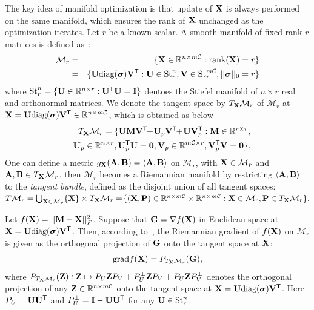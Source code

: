 \documentclass[letterpaper]{article}
\def\M{\mathcal{M}}
\def\R{{\mathbb R}}
\def\U{{\bf U}}
\def\V{{\bf V}}
\def\diag{\mbox{diag}}
\def\bsigma{\mbox{{\boldmath $\sigma$}}}
\def\trsp{{\sf T}}
\def\I{{\bf I}}
\def\0{{\bf 0}}
\def\G{{\bf G}}
\def\grad{{\text{grad}}}
\def\bZ{{\bf Z}}
\def\bA{{\bf A}}
\def\bB{{\bf B}}
\def\bM{{\bf M}}
\def\calC{{\mathcal{C}}}
\def\bX{{\bf X}}
\def\bA{{\bf A}}
\def\bX{{\bf X}}
\def\bP{{\bf P}}
\def\rank{{\text{rank}}}
\begin{document}
The key idea of manifold optimization is that update of $\bX$ is always performed on the same manifold, which ensures the rank of $\bX$ unchanged as the optimization iterates.
Let $r$ be a known scalar.
A smooth manifold of fixed-rank-$r$ matrices is defined as~\cite{vandereycken2013lowrank}:
\begin{eqnarray}
\M_{r} &=& \{\bX\in \R^{n\times m\calC}: \rank(\bX) = r\} \nonumber \\
       &=& \{\U\diag(\bsigma)\V^{\trsp}: \U \in \textrm{St}_{r}^{n}, \V \in
           \textrm{St}_{r}^{m\calC}, ||\bsigma||_0 = r\} \nonumber
\end{eqnarray}
\noindent
where $\textrm{St}_{r}^{n} = \{\U \in \R^{n\times r}:
\U^{\trsp}\U = \I \}$ dentoes the Stiefel manifold of $n\times r$ real and orthonormal matrices.
We denote the tangent space by $T_{\bX}\M_{r}$ of $\M_{r}$ at $\bX = \U\diag(\bsigma)\V^{\trsp} \in \R^{n \times m\calC}$,
which is obtained as below
\begin{eqnarray}\label{eq:tangent_vector}
&&T_{\bX}\M_{r} =  \{\U\bM\V^{\trsp} \!\!+\! \U_p\V^{\trsp} \!\!+\!
\U\V_p^{\trsp}: \bM \in \R^{r\times r}, \nonumber\\ && \U_p \in \R^{n\times r},
\U_p^{\trsp}\U = \0, \V_p \in \R^{m\calC \times r}, \V_p^{\trsp}\V = \0\}.
\end{eqnarray}
\noindent
One can define a metric $g_{\bX}({\bA},{\bB}) = \langle{\bA},{\bB}\rangle$ on $\M_{r}$,
with $\bX \in \M_{r}$ and ${\bA},{\bB} \in T_{\bX}\M_{r}$,
then $\M_{r}$ becomes a Riemannian manifold by restricting
$\langle\bA,\bB\rangle$
to the \emph{tangent bundle}, defined as the disjoint union of all tangent spaces:
$T\M_{r} = \bigcup_{\bX\in \M_{r}}\{\bX\} \times T_{\bX}\M_{r}
         = \! \{(\bX,\bP)\in \R^{n \times m\calC} \times \R^{n \times m\calC}: \bX \in \M_{r}, \bP \in T_{\bX}\M_{r}\}.$



Let $f(\bX) = || \bM - \bX ||_F^2$.
Suppose that $\G = \nabla f(\bX)$ in Euclidean space at $\bX = \U\diag(\bsigma)\V^{\trsp}$.
Then, according to~\cite{vandereycken2013lowrank}, the Riemannian gradient of $f(\bX)$ on $\M_r$ is given as the orthogonal
projection of $\G$ onto the tangent space at $\bX$:
\begin{eqnarray}\label{eq:grad}
\grad{f(\bX)} = P_{T_{\bX}\M_{r}}(\G)  ,
\end{eqnarray}
\noindent
where
$P_{T_{\bX}\M_{r}}(\bZ): \bZ \mapsto P_{U}\bZ P_{V} + P_{U}^{\perp} \bZ P_{V} + P_{U} \bZ P_{V}^{\perp}$
denotes the orthogonal projection of any
$\bZ \in \R^{n \times m\calC}$ onto the tangent space at $\bX = \U\diag(\bsigma)\V^{\trsp}$.
Here $P_U = \U \U^{\trsp}$ and $P_U^{\perp} = \I - \U \U^{\trsp}$ for any $\U \in \textrm{St}_{r}^{n}$.
\end{document}
